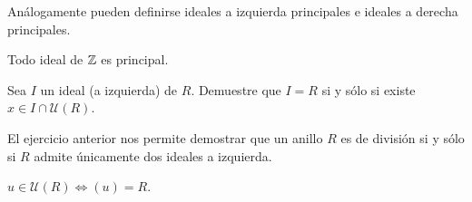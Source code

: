 Análogamente pueden definirse ideales a izquierda principales e ideales a derecha principales. 

\begin{example}
Todo ideal de $\mathbb{Z}$ es principal.	
\end{example}
 
\begin{exercise}
Sea $I$ un ideal (a izquierda) de $R$. Demuestre que $I=R$ si y sólo si existe $x\in I\cap\mathcal{U}(R)$.	
\end{exercise}

El ejercicio anterior nos permite demostrar que un anillo $R$ es de 
división si y sólo si $R$ admite únicamente dos ideales a izquierda.

\begin{remark}
$u\in\mathcal{U}(R)\Longleftrightarrow (u)=R$.
\end{remark}
